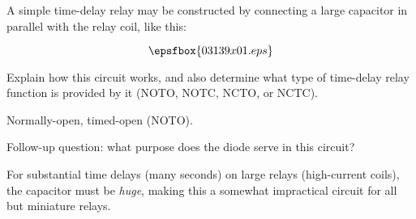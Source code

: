 

A simple time-delay relay may be constructed by connecting a large capacitor in parallel with the relay coil, like this:

$$\epsfbox{03139x01.eps}$$

Explain how this circuit works, and also determine what type of time-delay relay function is provided by it (NOTO, NOTC, NCTO, or NCTC).







Normally-open, timed-open (NOTO).

\vskip 10pt

Follow-up question: what purpose does the diode serve in this circuit?







For substantial time delays (many seconds) on large relays (high-current coils), the capacitor must be {\it huge}, making this a somewhat impractical circuit for all but miniature relays.  




